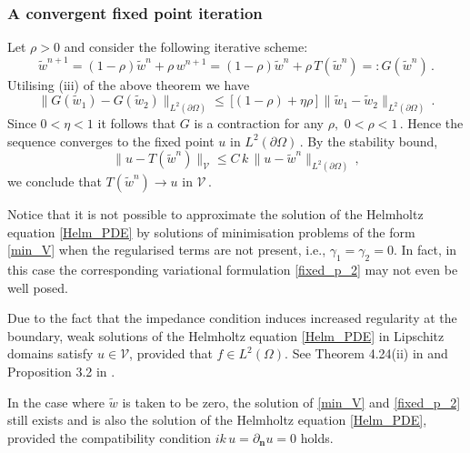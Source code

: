\documentclass[twoside,11pt]{article}
\def\Vc{{\mathscr V}}
\begin{document}
{\subsubsection*{A convergent fixed point iteration} Let $\rho >0$ and consider  the following iterative scheme:
  \begin{equation}\label{fixed_point_it_tilde}
  	\widetilde w ^{n+1} = (1-\rho)\widetilde w ^{n} + \rho\,  w^{n+1} = (1-\rho)\widetilde w ^{n} + \rho\,  T (\widetilde w ^{n}) =: G (\widetilde w ^{n} )\, .
  \end{equation}  
  Utilising (iii) of the above theorem we have
  $$  \|G( \widetilde w _ 1) - G(\widetilde w _2) \| _{L^2 (\partial \Omega)} %
\leq \, \Big [(1-\rho) + \eta \rho \, \Big ]\,  \| \widetilde w _ 1 - \widetilde w _2\|  _{L^2 (\partial \Omega)}  \, .$$
Since $ 0< \eta < 1    $ it follows that $G$ is a contraction for any $\rho ,$ $0< \rho < 1\, .$
Hence 
the sequence converges to the fixed point $u$ in  $L^2 (\partial \Omega)\, .$
By the stability bound, 
$$ \| u- T(\widetilde w ^{n}) \| _{\Vc} \leq C   \, k \, \| u - \widetilde w ^{n}  \|  _{L^2 (\partial \Omega)}   \, ,$$
we conclude that $T(\widetilde w ^{n}) \to u$ in $\Vc\, .$

\begin{remark}\label {Rem3.3}  
Notice that it is not possible to approximate the solution of the
Helmholtz equation \eqref{Helm_PDE} by solutions of minimisation
problems of the form \eqref{min_V} when the regularised terms are not
present, i.e., $\gamma_1 = \gamma_2 = 0$. In fact, in this case the
corresponding variational formulation \eqref{fixed_p_2} may not even
be well posed.
\end{remark}

\begin{remark}\label {Rem3.4}  
  Due to the fact that the impedance condition induces increased
  regularity at the boundary, weak solutions of the Helmholtz equation
  \eqref{Helm_PDE} in Lipschitz domains satisfy $u \in \Vc$, provided
  that $f \in L^2(\Omega)$. See Theorem 4.24(ii) in \cite{McLean_book}
  and Proposition 3.2 in \cite{Moiola_Spence2014}.
\end{remark}

\begin{remark}\label {Rem3.5}  
  In the case where $\widetilde w$ is taken to be zero, the solution
  of \eqref{min_V} and \eqref{fixed_p_2} still exists and is also the
  solution of the Helmholtz equation \eqref{Helm_PDE}, provided the
  compatibility condition $ik\, u = \partial _{\mathbf{n}} u = 0$
  holds.	
\end{remark}

}
\end{document}
